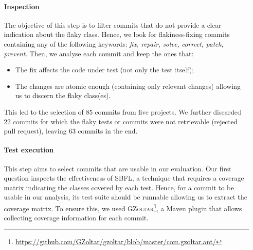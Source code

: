 \begin{table}[t]
\caption{Collected Data. \textit{ffc:} number of flakiness-fixing commits. \textit{all:} number of commits in the project.
\centering}
\centering
\label{tab:SD-info}
\end{table}


\paragraph{Inspection}
The objective of this step is to filter commits that do not provide a clear indication about the flaky class. Hence, we look for flakiness-fixing commits containing any of the following keywords: \textit{fix, repair, solve, correct, patch, prevent}. Then, we analyse each commit and keep the ones that:
\begin{itemize}[wide=0pt,noitemsep,topsep=0pt]
    \item The fix affects the code under test 
    (not only the test itself);
    \item The changes are atomic enough (\ie containing only relevant changes) allowing us to discern the flaky class(es). 
\end{itemize}

This led to the selection of 85 commits from five projects. We further discarded 22 commits for which the flaky tests or commits were not retrievable (\eg rejected pull request), leaving 63 commits in the end. 


\paragraph{Test execution}
This step aims to select commits that are usable in our evaluation.
Our first question inspects the effectiveness of SBFL, a technique that requires a coverage matrix indicating the classes covered by each test.
Hence, for a commit to be usable in our analysis, its test suite should be runnable allowing us to extract the coverage matrix.
To ensure this, we used  \textsc{GZoltar}\footnote{\url{https://github.com/GZoltar/gzoltar/blob/master/com.gzoltar.ant/}}, a Maven plugin that allows collecting coverage information for each commit.

